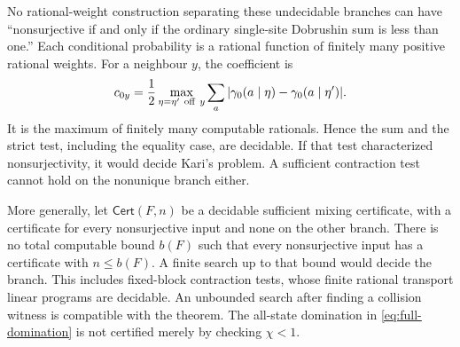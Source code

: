 \begin{remark}\label{rem:certificate}
No rational-weight construction separating these undecidable branches can have ``nonsurjective if and only if the ordinary single-site Dobrushin sum is less than one.'' Each conditional probability is a rational function of finitely many positive rational weights. For a neighbour $y$, the coefficient is
\[
 c_{0y}=\frac12\max_{\eta=\eta'\ {\rm off}\ y}
        \sum_a|\gamma_0(a\mid\eta)-\gamma_0(a\mid\eta')|.
\]
It is the maximum of finitely many computable rationals. Hence the sum and the strict test, including the equality case, are decidable. If that test characterized nonsurjectivity, it would decide Kari's problem. A sufficient contraction test cannot hold on the nonunique branch either.

More generally, let $\mathsf{Cert}(F,n)$ be a decidable sufficient mixing certificate, with a certificate for every nonsurjective input and none on the other branch. There is no total computable bound $b(F)$ such that every nonsurjective input has a certificate with $n\le b(F)$. A finite search up to that bound would decide the branch. This includes fixed-block contraction tests, whose finite rational transport linear programs are decidable. An unbounded search after finding a collision witness is compatible with the theorem. The all-state domination in \eqref{eq:full-domination} is not certified merely by checking $\chi<1$.
\end{remark}

